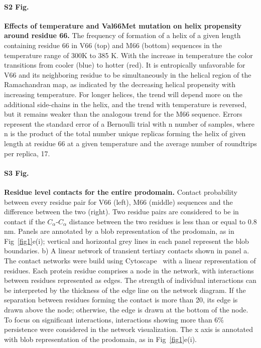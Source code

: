 \documentclass[10pt,letterpaper]{article}
\begin{document}
\paragraph*{S2 Fig.}
\label{S2_Fig}
{\bf Effects of temperature and Val66Met mutation on helix propensity around residue 66.} 
The frequency of formation of a helix of a given length containing residue 66 in V66 (top) and M66 (bottom) sequences in the temperature range of 300K to 385 K. With the increase in temperature the color transitions from cooler (blue) to hotter (red). It is entropically unfavorable for V66 and its neighboring residue to be simultaneously in the helical region of the Ramachandran map, as indicated by the decreasing helical propensity with increasing temperature. For longer helices, the trend will depend more on the additional side-chains in the helix, and the trend with temperature is reversed, but it remains weaker than the analogous trend for the M66 sequence. Errors represent the standard error of a Bernoulli trial with n number of samples, where n is the product of the total number unique replicas forming the helix of given length at residue 66 at a given temperature and the average number of roundtrips per replica, 17.

\paragraph*{S3 Fig.}
\label{S3_Fig}
{\bf Residue level contacts for the entire prodomain.}
Contact probability between every residue pair for V66 (left), M66 (middle) sequences and the difference between the two (right). Two residue pairs are considered to be in contact if the $C_{\alpha}$-$C_{\alpha}$ distance between the two residues is less than or equal to 0.8 nm. Panels are annotated by a blob representation of the prodomain, as in Fig~\ref{fig1}e(i); vertical and horizontal grey lines in each panel represent the blob boundaries. b) A linear network of transient tertiary contacts shown in panel a. The contact networks were build using Cytoscape~\cite{Ahlstrom2013} with a linear representation of residues. Each protein residue comprises a node in the network, with interactions between residues represented as edges. The strength of individual interactions can be interpreted by the thickness of the edge line on the network diagram. If the separation between residues forming the contact is more than 20, its edge is drawn above the node; otherwise, the edge is drawn at the bottom of the node. To focus on significant interactions, interactions showing more than 6\% persistence were considered in the network visualization. The x axis is annotated with blob representation of the prodomain, as in Fig~\ref{fig1}e(i).
\end{document}
